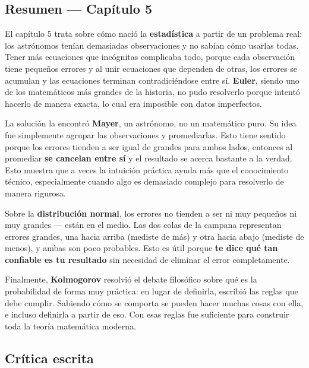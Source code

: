 \subsection{Resumen — Capítulo 5}

\begin{respuesta}[title=Resumen Capítulo 5]

El capítulo 5 trata sobre cómo nació la \textbf{estadística} a partir de un problema
real: los astrónomos tenían demasiadas observaciones y no sabían cómo usarlas todas.
Tener más ecuaciones que incógnitas complicaba todo, porque cada observación tiene
pequeños errores y al unir ecuaciones que dependen de otras, los errores se acumulan
y las ecuaciones terminan contradiciéndose entre sí. \textbf{Euler}, siendo uno de los
matemáticos más grandes de la historia, no pudo resolverlo porque intentó hacerlo de
manera exacta, lo cual era imposible con datos imperfectos.

\medskip

La solución la encontró \textbf{Mayer}, un astrónomo, no un matemático puro. Su idea
fue simplemente agrupar las observaciones y promediarlas. Esto tiene sentido porque
los errores tienden a ser igual de grandes para ambos lados, entonces al promediar
\textbf{se cancelan entre sí} y el resultado se acerca bastante a la verdad. Esto
muestra que a veces la intuición práctica ayuda más que el conocimiento técnico,
especialmente cuando algo es demasiado complejo para resolverlo de manera rigurosa.

\medskip

Sobre la \textbf{distribución normal}, los errores no tienden a ser ni muy pequeños
ni muy grandes — están en el medio. Las dos colas de la campana representan errores
grandes, una hacia arriba (mediste de más) y otra hacia abajo (mediste de menos), y
ambas son poco probables. Esto es útil porque \textbf{te dice qué tan confiable es
tu resultado} sin necesidad de eliminar el error completamente.

\medskip

Finalmente, \textbf{Kolmogorov} resolvió el debate filosófico sobre qué es la
probabilidad de forma muy práctica: en lugar de definirla, escribió las reglas que
debe cumplir. Sabiendo cómo se comporta se pueden hacer muchas cosas con ella, e
incluso definirla a partir de eso. Con esas reglas fue suficiente para construir
toda la teoría matemática moderna.

\end{respuesta}

\subsection{Crítica escrita}

